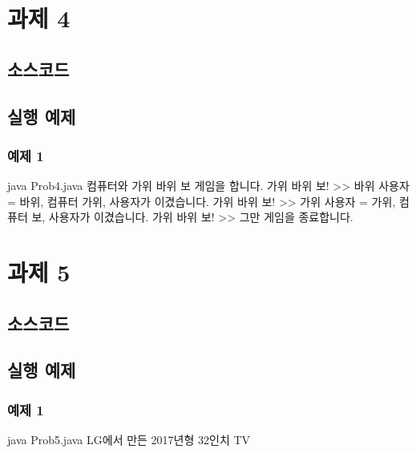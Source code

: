 \documentclass{article}
\theoremstyle{nonumberplain}
\begin{document}
\section{과제 4}
\subsection{소스코드}
\subsection{실행 예제}
\subsubsection{예제 1}
\begin{console}
java Prob4.java
컴퓨터와 가위 바위 보 게임을 합니다.
가위 바위 보! >> 바위
사용자 = 바위, 컴퓨터 가위, 사용자가 이겼습니다.
가위 바위 보! >> 가위
사용자 = 가위, 컴퓨터 보, 사용자가 이겼습니다.
가위 바위 보! >> 그만
게임을 종료합니다.
\end{console}



\section{과제 5}
\subsection{소스코드}
\subsection{실행 예제}
\subsubsection{예제 1}
\begin{console}
java Prob5.java
LG에서 만든 2017년형 32인치 TV
\end{console}
\end{document}

